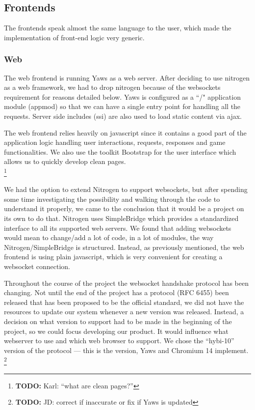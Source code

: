 \documentclass[11pt,a4paper]{report}
\newcommand{\todo}[1]{\footnote{{\color{red} {\bf TODO:} #1}}}
\begin{document}
\subsection{Frontends}
\label{sec:frontends}
The frontends speak almost the same language to the user, which made the
implementation of front-end logic very generic.

\subsubsection{Web}
The web frontend is running Yaws as a web server.
After deciding to use nitrogen as a web framework, we had to drop nitrogen 
because of the websockets requirement for reasons detailed below.
Yaws is configured as a ``/" application module (appmod) so that we can have a
single entry point for handling all the requests. Server side includes (ssi) are
also used to load static content via ajax.

The web frontend relies heavily on javascript since it contains a good part of the application logic handling user interactions, requests, responses and game functionalities. We also use the toolkit Bootstrap\cite{bootstrap} for the user interface which allows us to quickly develop clean pages.\\
\todo{Karl: ``what are clean pages?''}

We had the option to extend Nitrogen to support websockets, but after spending
some time investigating the possibility and walking through the code to
understand it properly, we came to the conclusion that it would be a project on
its own to do that. Nitrogen uses SimpleBridge which provides a standardized
interface to all its supported web servers. We found that adding websockets
would mean to change/add a lot of code, in a lot of modules, the way
Nitrogen/SimpleBridge is structured. Instead, as previously mentioned, the web
frontend is using plain javascript, which is very convenient for creating a
websocket connection.

Throughout the course of the project the websocket handshake protocol has
been changing.
Not until the end of the project has a protocol (RFC 6455) been released that
has been proposed to be the official standard, we did not have the resources
to update our system whenever a new version was released. Instead, a decision
on what version to support had to be made in the beginning of the project, so we
could focus developing our product.
It would influence what webserver to use and which web browser to support. We
chose the ``hybi-10'' version of the protocol --- this is the version, Yaws and
Chromium 14 implement. 
\todo{JD: correct if inaccurate or fix if Yaws is updated}
\end{document}
